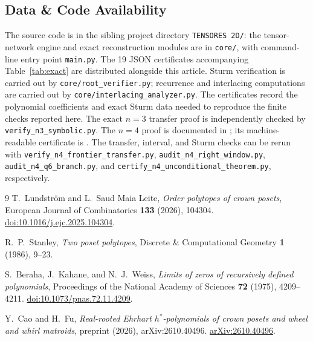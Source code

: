 \documentclass[11pt,a4paper]{article}
\theoremstyle{definition}
\begin{document}
\subsection{Data \& Code Availability}
\label{sec:n4-reproducibility}

The source code is in the sibling project directory \texttt{TENSORES 2D/}:
the tensor-network engine and exact reconstruction modules are in
\texttt{core/}, with command-line entry point \texttt{main.py}. The 19
JSON certificates accompanying Table~\ref{tab:exact} are distributed
alongside this article. Sturm verification is carried out by
\texttt{core/root\_verifier.py}; recurrence and interlacing computations
are carried out by \texttt{core/interlacing\_analyzer.py}. The
certificates record the polynomial coefficients and exact Sturm data
needed to reproduce the finite checks reported here. The exact $n=3$
transfer proof is independently checked by
\texttt{verify\_n3\_symbolic.py}. The $n=4$ proof is documented in
; its machine-readable
certificate is .
The transfer, interval, and Sturm checks can be rerun with
\texttt{verify\_n4\_frontier\_transfer.py},
\texttt{audit\_n4\_right\_window.py},
\texttt{audit\_n4\_q6\_branch.py}, and
\texttt{certify\_n4\_unconditional\_theorem.py}, respectively.

\begin{thebibliography}{9}
T.~Lundstr\"om and L.~Saud Maia Leite,
\emph{Order polytopes of crown posets},
European Journal of Combinatorics \textbf{133} (2026), 104304.
\href{https://doi.org/10.1016/j.ejc.2025.104304}{doi:10.1016/j.ejc.2025.104304}.

R.~P.~Stanley,
\emph{Two poset polytopes},
Discrete \& Computational Geometry \textbf{1} (1986), 9--23.

{\raggedright
S.~Beraha, J.~Kahane, and N.~J.~Weiss,
\emph{Limits of zeros of recursively defined polynomials},
Proceedings of the National Academy of Sciences \textbf{72} (1975), 4209--4211.
\href{https://doi.org/10.1073/pnas.72.11.4209}{doi:10.1073/pnas.72.11.4209}.\par}

Y.~Cao and H.~Fu,
\emph{Real-rooted Ehrhart $h^*$-polynomials of crown posets and wheel and whirl matroids},
preprint (2026), arXiv:2610.40496.
\href{https://arxiv.org/abs/2610.40496}{arXiv:2610.40496}.
\end{thebibliography}
\end{document}
